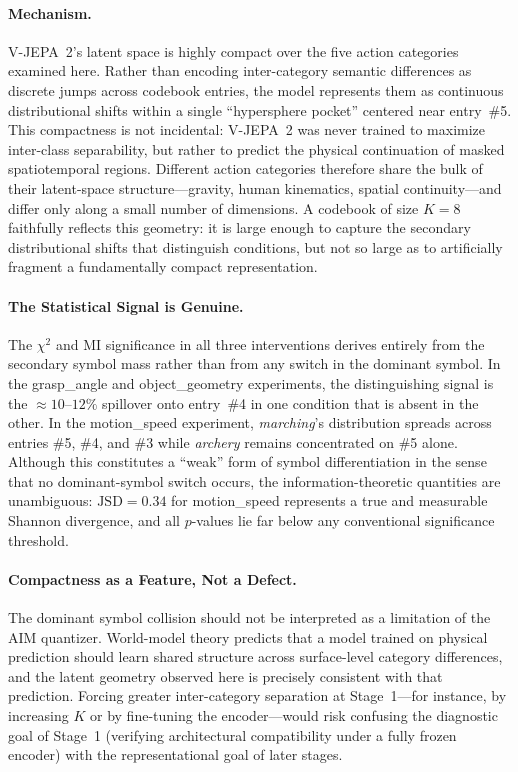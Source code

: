 \documentclass{article}
\begin{document}
\paragraph{Mechanism.}
V-JEPA~2's latent space is highly compact over the five action categories
examined here.  Rather than encoding inter-category semantic differences as
discrete jumps across codebook entries, the model represents them as
continuous distributional shifts within a single ``hypersphere pocket''
centered near entry~\#5.  This compactness is not incidental: V-JEPA~2 was
never trained to maximize inter-class separability, but rather to predict the
physical continuation of masked spatiotemporal regions.  Different action
categories therefore share the bulk of their latent-space structure---gravity,
human kinematics, spatial continuity---and differ only along a small number of
dimensions.  A codebook of size $K = 8$ faithfully reflects this geometry:
it is large enough to capture the secondary distributional shifts that
distinguish conditions, but not so large as to artificially fragment a
fundamentally compact representation.

\paragraph{The Statistical Signal is Genuine.}
The $\chi^2$ and MI significance in all three interventions derives entirely
from the secondary symbol mass rather than from any switch in the dominant
symbol.  In the grasp\_angle and object\_geometry experiments, the
distinguishing signal is the $\approx\!10$--$12\%$ spillover onto entry~\#4
in one condition that is absent in the other.  In the motion\_speed
experiment, \textit{marching}'s distribution spreads across entries \#5,
\#4, and \#3 while \textit{archery} remains concentrated on \#5 alone.
Although this constitutes a ``weak'' form of symbol differentiation in the
sense that no dominant-symbol switch occurs, the information-theoretic
quantities are unambiguous: $\mathrm{JSD} = 0.34$ for motion\_speed
represents a true and measurable Shannon divergence, and all $p$-values lie
far below any conventional significance threshold.

\paragraph{Compactness as a Feature, Not a Defect.}
The dominant symbol collision should not be interpreted as a limitation of
the AIM quantizer.  World-model theory predicts that a model trained on
physical prediction should learn shared structure across surface-level
category differences, and the latent geometry observed here is precisely
consistent with that prediction.  Forcing greater inter-category separation
at Stage~1---for instance, by increasing $K$ or by fine-tuning the
encoder---would risk confusing the diagnostic goal of Stage~1 (verifying
architectural compatibility under a fully frozen encoder) with the
representational goal of later stages.
\end{document}

